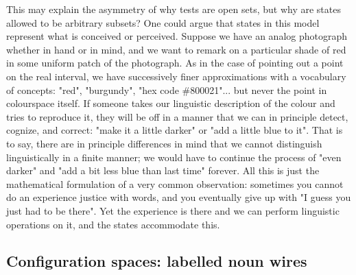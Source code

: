 This may explain the asymmetry of why tests are open sets, but why are states allowed to be arbitrary subsets? One could argue that states in this model represent what is conceived or perceived. Suppose we have an analog photograph whether in hand or in mind, and we want to remark on a particular shade of red in some uniform patch of the photograph. As in the case of pointing out a point on the real interval, we have successively finer approximations with a vocabulary of concepts: "red", "burgundy", "hex code \#800021"... but never the point in colourspace itself. If someone takes our linguistic description of the colour and tries to reproduce it, they will be off in a manner that we can in principle detect, cognize, and correct: "make it a little darker" or "add a little blue to it". That is to say, there are in principle differences in mind that we cannot distinguish linguistically in a finite manner; we would have to continue the process of "even darker" and "add a bit less blue than last time" forever. All this is just the mathematical formulation of a very common observation: sometimes you cannot do an experience justice with words, and you eventually give up with "I guess you just had to be there". Yet the experience is there and we can perform linguistic operations on it, and the states accommodate this.

\subsection{Configuration spaces: labelled noun wires}

